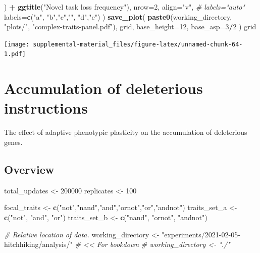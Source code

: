 \documentclass[]{book}
\newenvironment{Shaded}{\begin{snugshade}}{\end{snugshade}}
\newcommand{\CommentTok}[1]{\textcolor[rgb]{0.56,0.35,0.01}{\textit{#1}}}
\newcommand{\DataTypeTok}[1]{\textcolor[rgb]{0.13,0.29,0.53}{#1}}
\newcommand{\DecValTok}[1]{\textcolor[rgb]{0.00,0.00,0.81}{#1}}
\newcommand{\KeywordTok}[1]{\textcolor[rgb]{0.13,0.29,0.53}{\textbf{#1}}}
\newcommand{\NormalTok}[1]{#1}
\newcommand{\OperatorTok}[1]{\textcolor[rgb]{0.81,0.36,0.00}{\textbf{#1}}}
\newcommand{\StringTok}[1]{\textcolor[rgb]{0.31,0.60,0.02}{#1}}
\begin{document}
\begin{Shaded}
\begin{Highlighting}[]
\NormalTok{    ) }\OperatorTok{+}
\StringTok{    }\KeywordTok{ggtitle}\NormalTok{(}\StringTok{"Novel task loss frequency"}\NormalTok{),}
  \DataTypeTok{nrow=}\DecValTok{2}\NormalTok{,}
  \DataTypeTok{align=}\StringTok{"v"}\NormalTok{,}
  \CommentTok{# labels="auto"}
  \DataTypeTok{labels=}\KeywordTok{c}\NormalTok{(}\StringTok{"a"}\NormalTok{, }\StringTok{"b"}\NormalTok{,}\StringTok{"c"}\NormalTok{,}\StringTok{""}\NormalTok{, }\StringTok{"d"}\NormalTok{,}\StringTok{"e"}\NormalTok{)}
\NormalTok{)}
\KeywordTok{save_plot}\NormalTok{(}
   \KeywordTok{paste0}\NormalTok{(working_directory, }\StringTok{"plots/"}\NormalTok{, }\StringTok{"complex-traits-panel.pdf"}\NormalTok{),}
\NormalTok{   grid,}
   \DataTypeTok{base_height=}\DecValTok{12}\NormalTok{,}
   \DataTypeTok{base_asp=}\DecValTok{3}\OperatorTok{/}\DecValTok{2}
\NormalTok{)}
\NormalTok{grid}
\end{Highlighting}
\end{Shaded}

\texttt{[image: supplemental-material\_files/figure-latex/unnamed-chunk-64-1.pdf]}

\hypertarget{accumulation-of-deleterious-instructions}{%
\chapter{Accumulation of deleterious instructions}\label{accumulation-of-deleterious-instructions}}

The effect of adaptive phenotypic plasticity on the accumulation of deleterious genes.

\hypertarget{overview-3}{%
\section{Overview}\label{overview-3}}

\begin{Shaded}
\begin{Highlighting}[]
\NormalTok{total_updates <-}\StringTok{ }\DecValTok{200000}
\NormalTok{replicates <-}\StringTok{ }\DecValTok{100}

\NormalTok{focal_traits <-}\StringTok{ }\KeywordTok{c}\NormalTok{(}\StringTok{"not"}\NormalTok{,}\StringTok{"nand"}\NormalTok{,}\StringTok{"and"}\NormalTok{,}\StringTok{"ornot"}\NormalTok{,}\StringTok{"or"}\NormalTok{,}\StringTok{"andnot"}\NormalTok{)}
\NormalTok{traits_set_a <-}\StringTok{ }\KeywordTok{c}\NormalTok{(}\StringTok{"not"}\NormalTok{, }\StringTok{"and"}\NormalTok{, }\StringTok{"or"}\NormalTok{)}
\NormalTok{traits_set_b <-}\StringTok{ }\KeywordTok{c}\NormalTok{(}\StringTok{"nand"}\NormalTok{, }\StringTok{"ornot"}\NormalTok{, }\StringTok{"andnot"}\NormalTok{)}

\CommentTok{# Relative location of data.}
\NormalTok{working_directory <-}\StringTok{ "experiments/2021-02-05-hitchhiking/analysis/"} \CommentTok{# << For bookdown}
\CommentTok{# working_directory <- "./"}
\end{Highlighting}
\end{Shaded}
\end{document}
